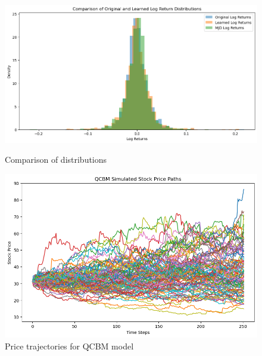 \documentclass[12pt]{article}
\numberwithin{equation}{section}
\begin{document}
\begin{figure}[h!]
    \centering
    \begin{minipage}{0.48\textwidth}
        \centering
        \includegraphics[width=\linewidth]{compdists.png}
        \caption{Comparison of distributions}
        \label{fig:compdists}
    \end{minipage}
    \hfill
    \begin{minipage}{0.48\textwidth}
        \centering
        \includegraphics[width=\linewidth]{pricepath2.png}
        \caption{Price trajectories for QCBM model}
        \label{fig:pricepath}
    \end{minipage}
\end{figure}
\end{document}
